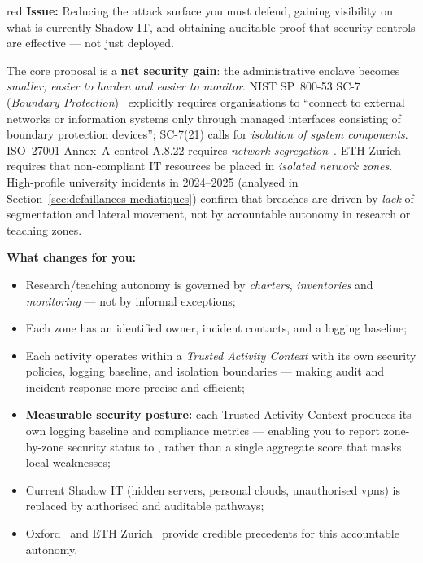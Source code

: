 \begin{stakeholderbox}{red}
\textbf{Issue:} Reducing the attack surface you must defend,
gaining visibility on what is currently Shadow IT, and
obtaining auditable proof that security controls are effective
--- not just deployed.

\medskip
The core proposal is a \textbf{net security gain}: the
administrative enclave becomes \emph{smaller, easier to harden
and easier to monitor}. NIST SP~800-53 SC-7
(\emph{Boundary Protection})~\cite{nist-sp800-53} explicitly
requires organisations to ``connect to external networks or
information systems only through managed interfaces consisting
of boundary protection devices''; SC-7(21) calls for
\emph{isolation of system components}. ISO~27001 Annex~A
control A.8.22 requires \emph{network
segregation}~\cite{iso27001}. ETH Zurich~\cite{eth-baseline}
requires that non-compliant IT resources be placed in
\emph{isolated network zones}. High-profile university incidents in 2024--2025
(analysed in Section~\ref{sec:defaillances-mediatiques}) confirm that
breaches are driven by \emph{lack} of segmentation and lateral
movement, not by accountable autonomy in research or teaching zones.

\medskip
\textbf{What changes for you:}
\begin{itemize}[nosep]
    \item Research/teaching autonomy is governed by
    \emph{charters}, \emph{inventories} and \emph{monitoring} ---
    not by informal exceptions;
    \item Each zone has an identified owner, incident contacts,
    and a logging baseline;
    \item Each activity operates within a \emph{Trusted Activity
    Context} with its own security policies, logging baseline, and
    isolation boundaries --- making audit and incident response more
    precise and efficient;
    \item \textbf{Measurable security posture:} each Trusted
    Activity Context produces its own logging baseline and
    compliance metrics --- enabling you to report zone-by-zone
    security status to , rather than a
    single aggregate score that masks local weaknesses;
    \item Current Shadow IT (hidden servers, personal clouds, unauthorised
    \gls{vpn}s) is replaced by authorised and auditable pathways;
    \item Oxford~\cite{oxford-infosec} and ETH Zurich~\cite{eth-baseline}
    provide credible precedents for this accountable autonomy.
\end{itemize}


\end{stakeholderbox}
